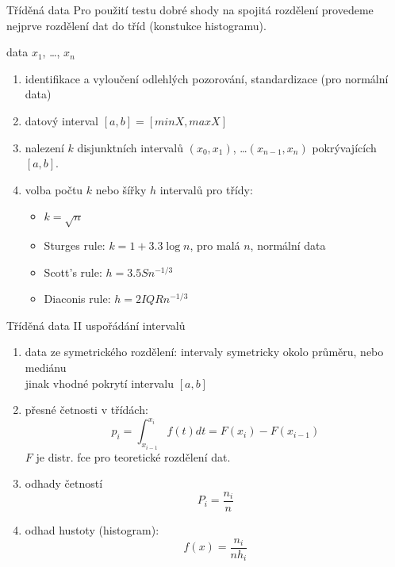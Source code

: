 \documentclass[smaller]{beamer}
\def\xskip{{\vspace{2ex}}}
\begin{document}
\begin{frame}{Tříděná data}
Pro použití testu dobré shody na spojitá rozdělení provedeme nejprve rozdělení dat do tříd (konstukce histogramu).

\xskip
data $x_1$, \dots, $x_n$
\begin{enumerate}
 \item identifikace a vyloučení odlehlých pozorování, standardizace (pro normální data)
 \item datový interval $[a,b]=[min X, max X]$
 \item nalezení $k$ disjunktních intervalů $(x_0, x_1)$, \dots $(x_{n-1}, x_n)$ pokrývajících $[a,b]$.
 \item volba počtu $k$ nebo šířky $h$ intervalů pro třídy:
    \begin{itemize}
     \item $k=\sqrt{n}$
     \item Sturges rule: $k=1+3.3 \log n$, pro malá $n$, normální data
     \item Scott's rule: $h = 3.5 S n^{-1/3}$
     \item Diaconis rule: $h = 2 IQR n^{-1/3}$
    \end{itemize}
\end{enumerate}
\end{frame}

\begin{frame}{Tříděná data II}
uspořádání intervalů
\begin{enumerate}
 \item data ze symetrického rozdělení: intervaly symetricky okolo průměru, nebo mediánu\\
       jinak vhodné pokrytí intervalu $[a,b]$
 \item přesné četnosti v třídách:
       \[
          p_i = \int_{x_{i-1}}^{x_i}f(t) dt = F(x_{i}) - F(x_{i-1})
       \]
       $F$ je distr. fce pro teoretické rozdělení dat.
 \item odhady četností
      \[
        P_i = \frac{n_i}{n}
      \]
 \item odhad hustoty (histogram):
      \[
         f(x)= \frac{n_i}{n h_i}
      \]
\end{enumerate}
\end{frame}
\end{document}
